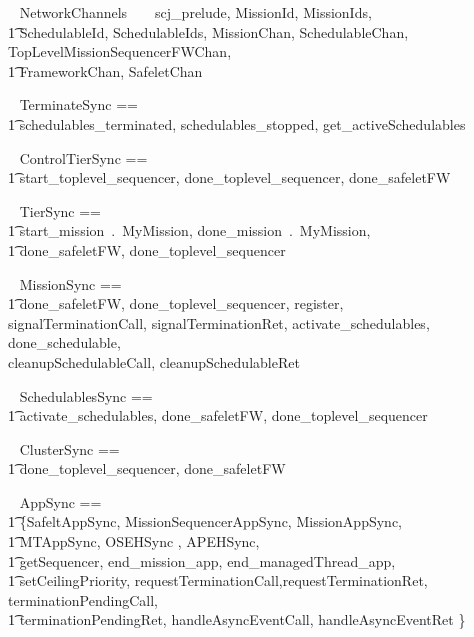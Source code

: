 

\begin{zsection}
	\SECTION ~ NetworkChannels ~ \parents ~ scj\_prelude, MissionId, MissionIds, \\
		\t1 SchedulableId, SchedulableIds, MissionChan, SchedulableChan, TopLevelMissionSequencerFWChan,\\
		\t1 FrameworkChan, SafeletChan
\end{zsection}
%
\begin{circus}
\circchannelset ~ TerminateSync == \\ \t1 \lchanset schedulables\_terminated, schedulables\_stopped, get\_activeSchedulables \rchanset
\end{circus}
%
\begin{circus}
\circchannelset ~ ControlTierSync ==\\ \t1 \lchanset start\_toplevel\_sequencer, done\_toplevel\_sequencer, done\_safeletFW \rchanset
\end{circus}
\begin{circus}
\circchannelset ~ TierSync == \\ \t1 \lchanset start\_mission~.~MyMission, done\_mission~.~MyMission,\\
	\t1 done\_safeletFW, done\_toplevel\_sequencer \rchanset
\end{circus}
%
\begin{circus}
\circchannelset ~ MissionSync == \\ \t1 \lchanset done\_safeletFW, done\_toplevel\_sequencer, register, \\
                 signalTerminationCall, signalTerminationRet, activate\_schedulables, done\_schedulable, \\
                 cleanupSchedulableCall, cleanupSchedulableRet  \rchanset
\end{circus}
%
\begin{circus}
\circchannelset ~ SchedulablesSync == \\ \t1 \lchanset activate\_schedulables, done\_safeletFW, done\_toplevel\_sequencer \rchanset
\end{circus}
%
\begin{circus}
\circchannelset ~ ClusterSync == \\ \t1 \lchanset done\_toplevel\_sequencer, done\_safeletFW \rchanset
\end{circus}
%
\begin{circus}
\circchannelset ~ AppSync == \\ \t1  \bigcup \{SafeltAppSync, MissionSequencerAppSync, MissionAppSync, \\ \t1 MTAppSync, OSEHSync , APEHSync,  \\ \t1
	\lchanset getSequencer, end\_mission\_app, end\_managedThread\_app, \\ \t1 setCeilingPriority, requestTerminationCall,requestTerminationRet, terminationPendingCall, \\ \t1 terminationPendingRet, handleAsyncEventCall, handleAsyncEventRet \rchanset  \}
\end{circus}
